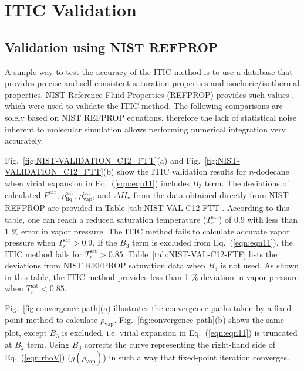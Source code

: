 \documentclass[5p,times]{elsarticle}
\begin{document}
\section{ITIC Validation}
\subsection{Validation using NIST REFPROP} \label{sec:NIST-VAL}
A simple way to test the accuracy of the ITIC method is to use a database that provides precise and self-consistent saturation properties and isochoric/isothermal properties. NIST Reference Fluid Properties (REFPROP) provides such values \cite{LEMMON-RP91,Bucker2006,Lemmon2004,Wagner2002}, which were used to validate the ITIC method. The following comparisons are solely based on NIST REFPROP equations, therefore the lack of statistical noise inherent to molecular simulation allows performing numerical integration very accurately. 

Fig.~\ref{fig:NIST-VALIDATION_C12_FTT}(a) and Fig.~\ref{fig:NIST-VALIDATION_C12_FTT}(b) show the ITIC validation results for \textit{n}-dodecane when virial expansion in Eq.~(\ref{eqn:eqn11}) includes $B_{3}$ term. The deviations of calculated $P^{\mathrm{sat}}$, $\rho_{\mathrm{liq}}^{\mathrm{sat}}$, $\rho_{\mathrm{vap}}^{\mathrm{sat}}$, and $\Delta H_{\mathrm{v}}$ from the data obtained directly from NIST REFPROP \cite{Lemmon2004} are provided in Table \ref{tab:NIST-VAL-C12-FTT}. According to this table, one can reach a reduced saturation temperature ($T_r^{\mathrm{sat}}$) of 0.9 with less than 1 \% error in vapor pressure. The ITIC method fails to calculate accurate vapor pressure when $T_r^{\mathrm{sat}}>0.9$. If the $B_3$ term is excluded from Eq.~(\ref{eqn:eqn11}), the ITIC method fails for $T_r^{\mathrm{sat}} > 0.85$. Table~\ref{tab:NIST-VAL-C12-FTF} lists the deviations from NIST REFPROP saturation data when $B_3$ is not used. As shown in this table, the ITIC method provides less than 1 \% deviation in vapor pressure when $T_r^{\mathrm{sat}} < 0.85$.

Fig.~\ref{fig:convergence-path}(a) illustrates the convergence paths taken by a fixed-point method to calculate $\rho_{\mathrm{vap}}$. Fig.~\ref{fig:convergence-path}(b) shows the same plot, except $B_3$ is excluded, i.e. virial expansion in Eq.~(\ref{eqn:eqn11}) is truncated at $B_{2}$ term. Using $B_3$ corrects the curve representing the right-hand side of Eq.~(\ref{eqn:rhoV}) ($g(\rho_{\mathrm{vap}})$) in such a way that fixed-point iteration converges. 
\end{document}
